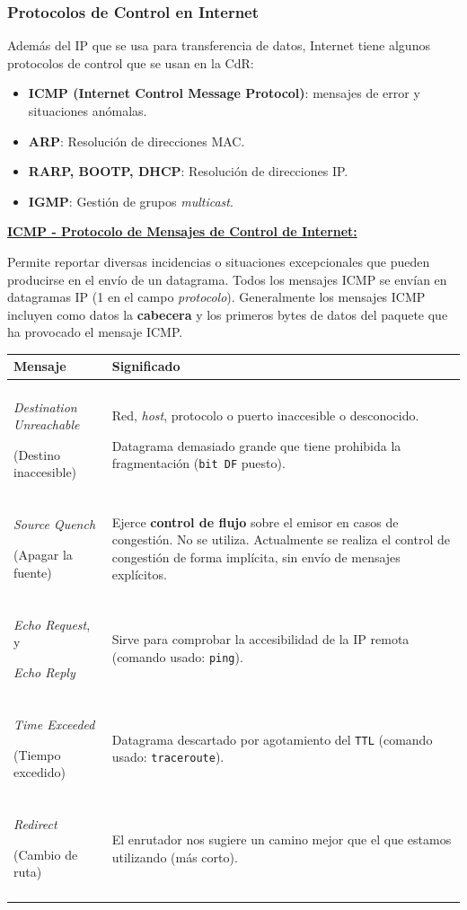 \documentclass[10pt,a4paper]{article}
\begin{document}
\subsubsection{Protocolos de Control en Internet}

Además del IP que se usa para transferencia de datos, Internet tiene algunos protocolos de control que se usan en la CdR:
\begin{itemize}
\item \textbf{ICMP (Internet Control Message Protocol)}: mensajes de error y situaciones anómalas.
\item \textbf{ARP}: Resolución de direcciones MAC.
\item \textbf{RARP, BOOTP, DHCP}: Resolución de direcciones IP.
\item \textbf{IGMP}: Gestión de grupos \textit{multicast}.
\end{itemize}

\underline{\textbf{ICMP - Protocolo de Mensajes de Control de Internet:}}

Permite reportar diversas incidencias o situaciones excepcionales que pueden producirse en el envío de un datagrama. Todos los mensajes ICMP se envían en datagramas IP (1 en el campo \textit{protocolo}). Generalmente los mensajes ICMP incluyen como datos la \textbf{cabecera} y los primeros bytes de datos del paquete que ha provocado el mensaje ICMP.

\begin{tabular}{p{4cm} p{11 cm}}
{\bf Mensaje} & {\bf Significado} \\\hline \\ [-1.5ex]
\textit{Destination Unreachable}

(Destino inaccesible)
& Red, \textit{host}, protocolo o puerto inaccesible o desconocido. 

Datagrama demasiado grande que tiene prohibida la fragmentación (\texttt{bit DF} puesto).
\\ [1ex] \hline \\ [-1.5ex]
\textit{Source Quench}

(Apagar la fuente)
& Ejerce \textbf{control de flujo} sobre el emisor en casos de congestión. No se utiliza. Actualmente se realiza el control de congestión de forma implícita, sin envío de mensajes explícitos.
\\ [1ex] \hline \\ [-1.5ex]
\textit{Echo Request}, y

\textit{Echo Reply}
& Sirve para comprobar la accesibilidad de la IP remota (comando usado: \texttt{ping}).
\\ [1ex] \hline \\ [-1.5ex]
\textit{Time Exceeded}

(Tiempo excedido)
& Datagrama descartado por agotamiento del \texttt{TTL} (comando usado: \texttt{traceroute}).
\\ [1ex] \hline \\ [-1.5ex]
\textit{Redirect}

(Cambio de ruta)
& El enrutador nos sugiere un camino mejor que el que estamos utilizando (más corto).
\\ [1ex] \hline \\ [-1.5ex]
\end{tabular}
\end{document}
